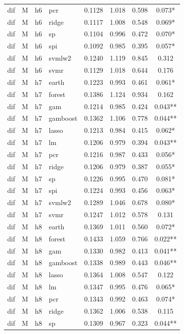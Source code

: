 \begin{ThreePartTable}
\begin{longtable}[t]{llclcccc}
dif & M & h6 & pcr & 0.1128 & 1.018 & 0.598 & 0.073*\\
dif & M & h6 & ridge & 0.1117 & 1.008 & 0.548 & 0.069*\\
dif & M & h6 & sp & 0.1104 & 0.996 & 0.472 & 0.070*\\
dif & M & h6 & spi & 0.1092 & 0.985 & 0.395 & 0.057*\\
dif & M & h6 & svmlw2 & 0.1240 & 1.119 & 0.845 & 0.312\\
dif & M & h6 & svmr & 0.1129 & 1.018 & 0.644 & 0.176\\
\addlinespace
dif & M & h7 & earth & 0.1223 & 0.993 & 0.461 & 0.061*\\
dif & M & h7 & forest & 0.1386 & 1.124 & 0.934 & 0.162\\
dif & M & h7 & gam & 0.1214 & 0.985 & 0.424 & 0.043**\\
dif & M & h7 & gamboost & 0.1362 & 1.106 & 0.778 & 0.044**\\
dif & M & h7 & lasso & 0.1213 & 0.984 & 0.415 & 0.062*\\
dif & M & h7 & lm & 0.1206 & 0.979 & 0.394 & 0.043**\\
dif & M & h7 & pcr & 0.1216 & 0.987 & 0.433 & 0.056*\\
dif & M & h7 & ridge & 0.1206 & 0.979 & 0.387 & 0.055*\\
dif & M & h7 & sp & 0.1226 & 0.995 & 0.470 & 0.081*\\
dif & M & h7 & spi & 0.1224 & 0.993 & 0.456 & 0.063*\\
dif & M & h7 & svmlw2 & 0.1289 & 1.046 & 0.678 & 0.080*\\
dif & M & h7 & svmr & 0.1247 & 1.012 & 0.578 & 0.131\\
\addlinespace
dif & M & h8 & earth & 0.1369 & 1.011 & 0.560 & 0.072*\\
dif & M & h8 & forest & 0.1433 & 1.059 & 0.766 & 0.022**\\
dif & M & h8 & gam & 0.1330 & 0.982 & 0.413 & 0.041**\\
dif & M & h8 & gamboost & 0.1338 & 0.989 & 0.443 & 0.046**\\
dif & M & h8 & lasso & 0.1364 & 1.008 & 0.547 & 0.122\\
dif & M & h8 & lm & 0.1347 & 0.995 & 0.476 & 0.065*\\
dif & M & h8 & pcr & 0.1343 & 0.992 & 0.463 & 0.074*\\
dif & M & h8 & ridge & 0.1362 & 1.006 & 0.538 & 0.115\\
dif & M & h8 & sp & 0.1309 & 0.967 & 0.323 & 0.044**\\

\end{longtable}
\end{ThreePartTable}

